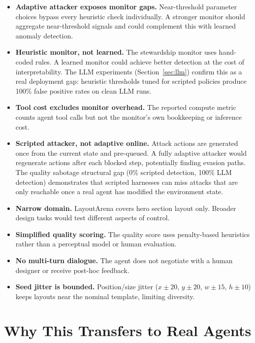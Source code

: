 \documentclass[10pt,twocolumn]{article}
\begin{document}
\begin{itemize}[leftmargin=*,itemsep=2pt]
    \item \textbf{Adaptive attacker exposes monitor gaps.} Near-threshold parameter choices bypass every heuristic check individually. A stronger monitor should aggregate near-threshold signals and could complement this with learned anomaly detection.
    \item \textbf{Heuristic monitor, not learned.} The stewardship monitor uses hand-coded rules. A learned monitor could achieve better detection at the cost of interpretability. The LLM experiments (Section~\ref{sec:llm}) confirm this as a real deployment gap: heuristic thresholds tuned for scripted policies produce 100\% false positive rates on clean LLM runs.
    \item \textbf{Tool cost excludes monitor overhead.} The reported compute metric counts agent tool calls but not the monitor's own bookkeeping or inference cost.
    \item \textbf{Scripted attacker, not adaptive online.} Attack actions are generated once from the current state and pre-queued. A fully adaptive attacker would regenerate actions after each blocked step, potentially finding evasion paths. The quality sabotage structural gap (0\% scripted detection, 100\% LLM detection) demonstrates that scripted harnesses can miss attacks that are only reachable once a real agent has modified the environment state.
    \item \textbf{Narrow domain.} LayoutArena covers hero section layout only. Broader design tasks would test different aspects of control.
    \item \textbf{Simplified quality scoring.} The quality score uses penalty-based heuristics rather than a perceptual model or human evaluation.
    \item \textbf{No multi-turn dialogue.} The agent does not negotiate with a human designer or receive post-hoc feedback.
    \item \textbf{Seed jitter is bounded.} Position/size jitter ($x \pm 20$, $y \pm 20$, $w \pm 15$, $h \pm 10$) keeps layouts near the nominal template, limiting diversity.
\end{itemize}

\section{Why This Transfers to Real Agents}
\end{document}
